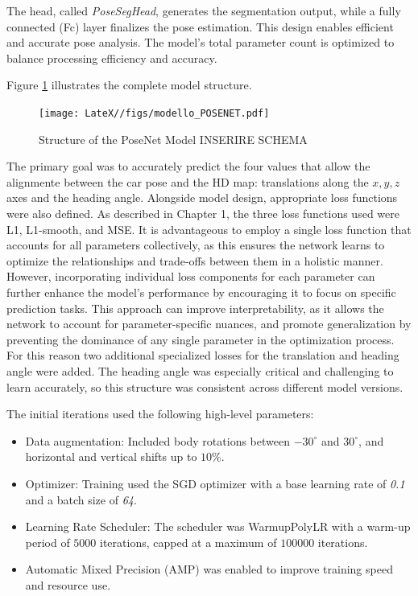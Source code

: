 The head, called \textit{PoseSegHead}, generates the segmentation output, while a fully connected (Fc) layer finalizes the pose estimation. This design enables efficient and accurate pose analysis. The model’s total parameter count is optimized to balance processing efficiency and accuracy.

Figure \ref{fig:enter-label12} illustrates the complete model structure.
\begin{figure}[H]
    \centering
    \texttt{[image: LateX//figs/modello\_POSENET.pdf]}
    \caption{Structure of the PoseNet Model INSERIRE SCHEMA}
    \label{fig:enter-label12}
\end{figure}

The primary goal was to accurately predict the four values that allow the alignmente between the car pose and the HD map: translations along the \( x, y, z \) axes and the heading angle. Alongside model design, appropriate loss functions were also defined. As described in Chapter 1, the three loss functions used were L1, L1-smooth, and MSE.
It is advantageous to employ a single loss function that accounts for all parameters collectively, as this ensures the network learns to optimize the relationships and trade-offs between them in a holistic manner. However, incorporating individual loss components for each parameter can further enhance the model's performance by encouraging it to focus on specific prediction tasks. This approach can improve interpretability, as it allows the network to account for parameter-specific nuances, and promote generalization by preventing the dominance of any single parameter in the optimization process. For this reason two additional specialized losses for the translation and heading angle were added. 
The heading angle was especially critical and challenging to learn accurately, so this structure was consistent across different model versions.

The initial iterations used the following high-level parameters:
\begin{itemize}
    \item Data augmentation: Included body rotations between $-30^\circ$ and $30^\circ$, and horizontal and vertical shifts up to $10\%$.
    \item Optimizer: Training used the SGD optimizer with a base learning rate of \textit{0.1} and a batch size of \textit{64}.
    \item Learning Rate Scheduler: The scheduler was WarmupPolyLR \cite{kalra2024warmuplearningrateunderlying} with a warm-up period of $5000$ iterations, capped at a maximum of $100000$ iterations.
    \item Automatic Mixed Precision (AMP) was enabled to improve training speed and resource use.
\end{itemize}

